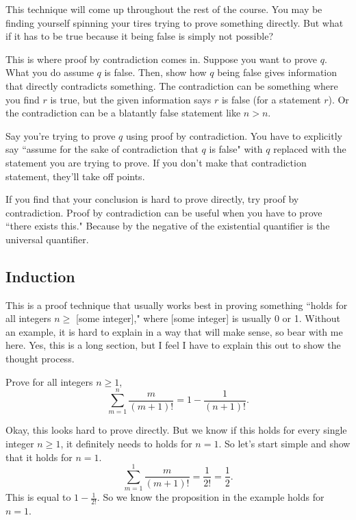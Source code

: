 \documentclass[11pt]{scrartcl}
\begin{document}
This technique will come up throughout the rest of the course. You may be finding yourself spinning your tires trying to prove something directly. But what if it has to be true because it being false is simply not possible?

This is where proof by contradiction comes in. Suppose you want to prove $q$. What you do assume $q$ is false. Then, show how $q$ being false gives information that directly contradicts something. The contradiction can be something where you find $r$ is true, but the given information says $r$ is false (for a statement $r$). Or the contradiction can be a blatantly false statement like $n > n$.

\begin{caveat}
    Say you're trying to prove $q$ using proof by contradiction. You have to explicitly say ``assume for the sake of contradiction that $q$ is false" with $q$ replaced with the statement you are trying to prove. If you don't make that contradiction statement, they'll take off points.
\end{caveat}

\begin{advice}
    If you find that your conclusion is hard to prove directly, try proof by contradiction. Proof by contradiction can be useful when you have to prove ``there exists this." Because by the negative of the existential quantifier is the universal quantifier.
\end{advice}

\subsection{Induction}

This is a proof technique that usually works best in proving something ``holds for all integers $n \geq$ [some integer]," where [some integer] is usually 0 or 1. Without an example, it is hard to explain in a way that will make sense, so bear with me here. Yes, this is a long section, but I feel I have to explain this out to show the thought process.

\begin{example}
    Prove for all integers $n \geq 1$, \[\sum_{m=1}^{n}\frac{m}{(m+1)!} = 1 - \frac{1}{(n+1)!}.\]
\end{example}
Okay, this looks hard to prove directly. But we know if this holds for every single integer $n \geq 1$, it definitely needs to holds for $n = 1$. So let's start simple and show that it holds for $n = 1$. \[\sum_{m=1}^{1}\frac{m}{(m+1)!} = \frac{1}{2!} = \frac{1}{2}.\] This is equal to $1 - \frac{1}{2!}$. So we know the proposition in the example holds for $n = 1$.
\end{document}
